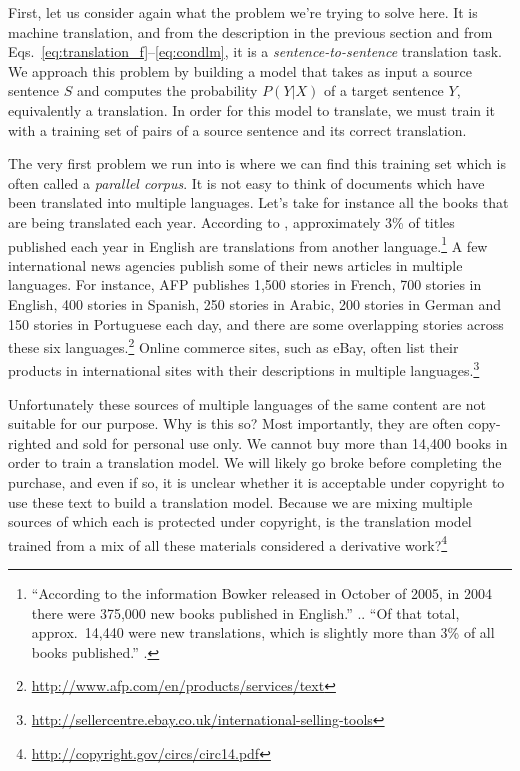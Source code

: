 \documentclass{report}
\begin{document}
First, let us consider again what the problem we're trying to solve here. It is
machine translation, and from the description in the previous section and from
Eqs.~\eqref{eq:translation_f}--\eqref{eq:condlm}, it is a {\em
sentence-to-sentence} translation task. We approach this problem by building a
model that takes as input a source sentence $S$ and computes the probability
$P(Y|X)$ of a target sentence $Y$, equivalently a translation. In order for this
model to translate, we must train it with a training set of pairs of a source
sentence and its correct translation.

The very first problem we run into is where we can find this training set which
is often called a {\em parallel corpus}. It is not easy to think of documents
which have been translated into multiple languages. Let's take for instance all
the books that are being translated each year. According to \citet{post2011},
approximately 3\% of titles published each year in English are
translations from another language.\footnote{
    ``According to the information Bowker released in October of 2005, in 2004 there
    were 375,000 new books published in English.'' .. ``Of that total,
    approx.\ 14,440 were new translations, which is slightly more than
    3\% of all books published.'' \citep{post2011}.
} 
A few international news agencies publish some of their news articles in
multiple languages. For instance, AFP publishes 1,500 stories in French, 700
stories in English, 400 stories in Spanish, 250 stories in Arabic, 200 stories
in German and 150 stories in Portuguese each day, and there are some overlapping
stories across these six languages.\footnote{
    \url{http://www.afp.com/en/products/services/text}
} 
Online commerce sites, such as eBay, often list their products in international
sites with their descriptions in multiple languages.\footnote{
    \url{http://sellercentre.ebay.co.uk/international-selling-tools}
}

Unfortunately these sources of multiple languages of the same content are not
suitable for our purpose. Why is this so? Most importantly, they are often
copy-righted and sold for personal use only. We cannot buy more than 14,400
books in order to train a translation model. We will likely go broke before
completing the purchase, and even if so, it is unclear whether it is acceptable
under copyright to use these text to build a translation model. Because we are
mixing multiple sources of which each is protected under copyright, is the
translation model trained from a mix of all these materials considered a
derivative work?\footnote{
    \url{http://copyright.gov/circs/circ14.pdf}
}
\end{document}
